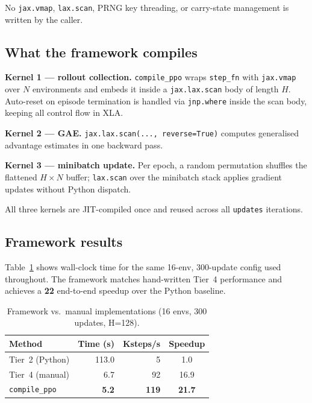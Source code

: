 \documentclass[11pt,twocolumn]{article}
\begin{document}
No \texttt{jax.vmap}, \texttt{lax.scan}, PRNG key threading, or carry-state
management is written by the caller.

\subsection{What the framework compiles}

\textbf{Kernel 1 — rollout collection.}
\texttt{compile\_ppo} wraps \texttt{step\_fn} with \texttt{jax.vmap} over $N$
environments and embeds it inside a \texttt{jax.lax.scan} body of length $H$.
Auto-reset on episode termination is handled via \texttt{jnp.where} inside the
scan body, keeping all control flow in XLA.

\textbf{Kernel 2 — GAE.}
\texttt{jax.lax.scan(..., reverse=True)} computes generalised advantage
estimates in one backward pass.

\textbf{Kernel 3 — minibatch update.}
Per epoch, a random permutation shuffles the flattened $H \times N$ buffer;
\texttt{lax.scan} over the minibatch stack applies gradient updates without
Python dispatch.

All three kernels are JIT-compiled once and reused across all \texttt{updates}
iterations.

\subsection{Framework results}

Table~\ref{tab:framework} shows wall-clock time for the same 16-env,
300-update config used throughout. The framework matches hand-written Tier~4
performance and achieves a \textbf{22\texttimes{}} end-to-end speedup over
the Python baseline.

\begin{table}[h]
\centering
\small
\caption{Framework vs.\ manual implementations (16 envs, 300 updates, H=128).}
\label{tab:framework}
\begin{tabular}{lrrc}
\toprule
Method & Time (s) & Ksteps/s & Speedup \\
\midrule
Tier~2 (Python)     & 113.0 &    5 & 1.0\texttimes{} \\
Tier~4 (manual)     &   6.7 &   92 & 16.9\texttimes{} \\
\texttt{compile\_ppo} & \textbf{5.2} & \textbf{119} & \textbf{21.7\texttimes{}} \\
\bottomrule
\end{tabular}
\end{table}
\end{document}
